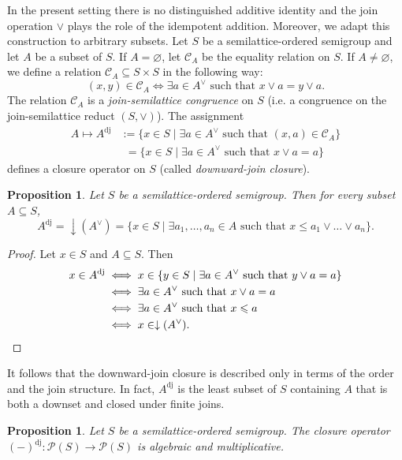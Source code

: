 \documentclass[10pt, reqno]{amsart}
\theoremstyle{plain}
\newtheorem{prop}[theorem]{Proposition}
\theoremstyle{definition}
\begin{document}
In the present setting there is no distinguished additive identity and the join operation $\lor$ plays the role of the idempotent addition. Moreover, we adapt this construction to arbitrary subsets. Let $S$ be a semilattice-ordered semigroup and let $A$ be a subset of $S$. If $A = \varnothing$, let $\mathcal{C}_A$ be the equality relation on $S$. If $A \neq \varnothing$, we define a relation $\mathcal{C}_A \subseteq S \times S$ in the following way: $$(x, y)\in\mathcal{C}_A \iff \exists a \in A^\lor \text{ such that } x \lor a = y \lor a.$$ The relation $\mathcal{C}_A$ is a \emph{join-semilattice congruence} on $S$ (i.e. a congruence on the join-semilattice reduct $(S, \lor)$). The assignment 
\begin{align*} 
    A \mapsto A^\mathrm{dj} &:= \{x \in S \mid \exists a \in A^\lor \text{ such that } (x, a)\in\mathcal{C}_A\} \\ &\phantom{:}= \{x \in S \mid \exists a \in A^\lor \text{ such that } x \lor a = a\}
\end{align*}
defines a closure operator on $S$ (called \emph{downward-join closure}). 
\begin{prop}\label{equivalent_form_of_downward_join_closure}
Let $S$ be a semilattice-ordered semigroup. Then for every subset $A \subseteq S$,  
\begin{equation*} 
    A^\mathrm{dj} = \downarrow(A^\lor) = \{x\in S\mid \exists a_1, \ldots, a_n \in A \text{ such that } x \leqslant a_1 \lor \ldots \lor a_n\}. 
\end{equation*}
\end{prop}
\begin{proof}
    Let $x \in S$ and $A \subseteq S$. Then 
    \begin{align*}
        x \in A^\mathrm{dj} &\iff x \in \{y \in S \mid \exists a \in A^\lor \text{ such that } y \lor a = a\} \\ &\iff \exists a\in A^\lor \text{ such that } x \lor a = a \\ & \iff \exists a \in A^\lor \text{ such that } x \leqslant a \\ &\iff x \in \downarrow(A^\lor). \qedhere 
    \end{align*}
\end{proof}
\noindent It follows that the downward-join closure is described only in terms of the order and the join structure. In fact, $A^\mathrm{dj}$ is the least subset of $S$ containing $A$ that is both a downset and closed under finite joins. 
\begin{prop}\label{downward_join_closure_is_algebraic}
    Let $S$ be a semilattice-ordered semigroup. The closure operator $(-)^\mathrm{dj} : \mathcal{P}(S) \rightarrow\mathcal{P}(S)$ is algebraic and multiplicative.
\end{prop}
\end{document}
